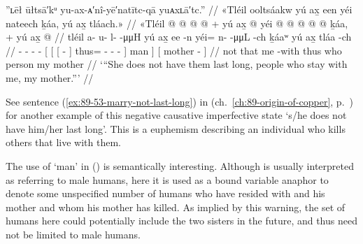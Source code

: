 \ex\label{ex:92-125-not-lasting-with-my-mother-around}%
%
\begingl
	\glpreamble	”ʟēł ūłtsā′kᵘ yu-ax-ᴀ′nî-yē′natītc-qā yuᴀxʟā′tc.” //
	\glpreamble	«\!Tléil ooltsáakw yú ax̱ een yéi nateech ḵáa, yú ax̱ tláach.\!» //
	\gla	«\!Tléil  @ {} @ {} @ {} @ {} +
		{} yú {} {} ax̱  @ {} {}
			yéi @  @ {} @ {} @ {} @ {} {}
			ḵáa, {} +
		{} yú ax̱  @ {} {} //
	\glb	\pqp{}tléil a- u- l-  -μμH
		{} yú {} {} ax̱ ee -n {}
			yéi= n-  -μμL -ch {} {}
			ḵáaʷ {}
		{} yú ax̱ tláa -ch {} //
	\glc	\pqp{} - - -  -
		{}[  {}[ {}[   - {}]
			thus= -  - - \· {}]
			man {}]
		{}[   mother - {}] //
	\gld	\pqp{}not  {} {} {} {}
		{} that {} {} me {} -with {}
			thus  {} {} {} \·who {}
			person {}
		{} my mother {} {} //
	\glft	‘“She does not have them last long, people who stay with me, my mother.”’
		//
\endgl
\xe

See sentence (\ref{ex:89-53-marry-not-last-long}) in  (ch.\ \ref{ch:89-origin-of-copper}, p.\ \pageref{ex:89-53-marry-not-last-long}) for another example of this negative causative imperfective state  ‘s/he does not have him/her last long’.
This is a euphemism describing an individual who kills others that live with them.

The use of  ‘man’ in (\lastx) is semantically interesting.
Although  is usually interpreted as referring to male humans, here it is used as a bound variable anaphor to denote some unspecified number of humans who have resided with  and his mother and whom his mother has killed.
As implied by this warning, the set of humans here could potentially include the two sisters in the future, and thus  need not be limited to male humans.



